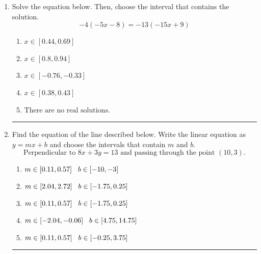 \documentclass[14pt]{extbook}
\newcommand{\litem}[1]{\item#1\hspace*{-1cm}\rule{\textwidth}{0.4pt}}
\begin{document}
\begin{enumerate}
{\begin{enumerate}[label=\Alph*.]
\end{enumerate} }
\litem{
Solve the equation below. Then, choose the interval that contains the solution.\[ -4(-5x -8) = -13(-15x + 9) \]\begin{enumerate}[label=\Alph*.]
\item \( x \in [0.44, 0.69] \)
\item \( x \in [0.8, 0.94] \)
\item \( x \in [-0.76, -0.33] \)
\item \( x \in [0.38, 0.43] \)
\item \( \text{There are no real solutions.} \)

\end{enumerate} }
\litem{
Find the equation of the line described below. Write the linear equation as $ y=mx+b $ and choose the intervals that contain $m$ and $b$.\[ \text{Perpendicular to } 8 x + 3 y = 13 \text{ and passing through the point } (10, 3). \]\begin{enumerate}[label=\Alph*.]
\item \( m \in [0.11, 0.57] \hspace*{3mm} b \in [-10, -3] \)
\item \( m \in [2.04, 2.72] \hspace*{3mm} b \in [-1.75, 0.25] \)
\item \( m \in [0.11, 0.57] \hspace*{3mm} b \in [-1.75, 0.25] \)
\item \( m \in [-2.04, -0.06] \hspace*{3mm} b \in [4.75, 14.75] \)
\item \( m \in [0.11, 0.57] \hspace*{3mm} b \in [-0.25, 3.75] \)


\end{enumerate}}
\end{enumerate}
\end{document}
